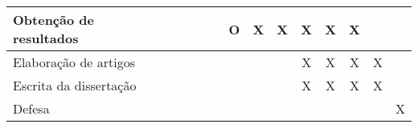 \begin{table}[!htp]
\begin{threeparttable}[b]
\begin{tabular}{|p{3.1cm}|c|c|c|c|c|c|c|c|c|c|c|c|c|}
Obtenção de resultados                        &                                                 &                                                 &                                                 &                                                 &                                                 & O                                               & X                                                & X                                               & X                                               & X                                               & X                                                &                                                 &                                                 \\ \hline
Elaboração de artigos                         &                                                 &                                                 &                                                 &                                                 &                                                 &                                                 &                                                 &                                                 & X                                               & X                                               & X                                               & X                                               &                                                 \\ \hline
Escrita da dissertação                        &                                                 &                                                 &                                                &                                                 &                                                &                                                 &                                                &                                                 & X                                               & X                                               & X                                               & X                                               &                                                 \\ \hline
Defesa                                        &                                                 &                                                 &                                                 &                                                 &                                                 &                                                 &                                                 &                                                 &                                                 &                                                 &                                                 &                                                 & X                                               \\ \hline

\end{tabular}
\end{threeparttable}
\end{table}
